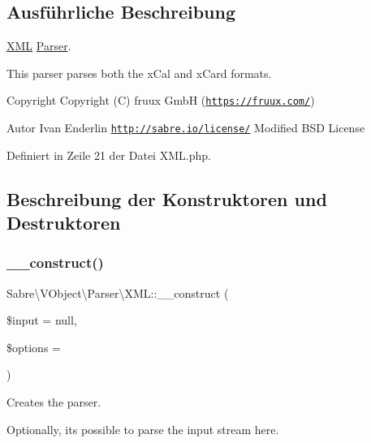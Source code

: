 \subsection{Ausführliche Beschreibung}
\mbox{\hyperlink{class_sabre_1_1_v_object_1_1_parser_1_1_x_m_l}{X\+ML}} \mbox{\hyperlink{class_sabre_1_1_v_object_1_1_parser_1_1_parser}{Parser}}.

This parser parses both the x\+Cal and x\+Card formats.

\begin{DoxyCopyright}{Copyright}
Copyright (C) fruux GmbH (\href{https://fruux.com/}{\tt https\+://fruux.\+com/}) 
\end{DoxyCopyright}
\begin{DoxyAuthor}{Autor}
Ivan Enderlin  \href{http://sabre.io/license/}{\tt http\+://sabre.\+io/license/} Modified B\+SD License 
\end{DoxyAuthor}


Definiert in Zeile 21 der Datei X\+M\+L.\+php.



\subsection{Beschreibung der Konstruktoren und Destruktoren}
\mbox{\label{class_sabre_1_1_v_object_1_1_parser_1_1_x_m_l_a9a69f42e42441fe60d93b0f42628188b}} 
\subsubsection{\texorpdfstring{\+\_\+\+\_\+construct()}{\_\_construct()}}
{\footnotesize\ttfamily Sabre\textbackslash{}\+V\+Object\textbackslash{}\+Parser\textbackslash{}\+X\+M\+L\+::\+\_\+\+\_\+construct (\begin{DoxyParamCaption}\item[{}]{\$input = {\ttfamily null},  }\item[{}]{\$options = {} }\end{DoxyParamCaption})}

Creates the parser.

Optionally, it\textquotesingle{}s possible to parse the input stream here.


